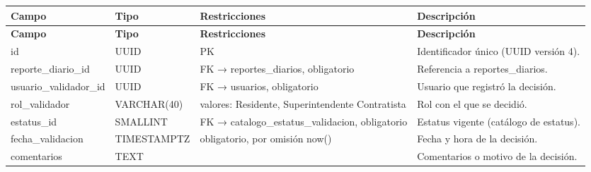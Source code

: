 \begin{xltabular}{\linewidth}{@{}>{\ttfamily\footnotesize}p{4.9cm}>{\ttfamily\footnotesize}p{2.4cm}>{\raggedright\arraybackslash\footnotesize}p{3.3cm}>{\footnotesize}X@{}}
\toprule\normalfont\sffamily\bfseries\footnotesize Campo & \normalfont\sffamily\bfseries\footnotesize Tipo & \sffamily\bfseries Restricciones & \sffamily\bfseries Descripción\\\midrule\endfirsthead
\toprule\normalfont\sffamily\bfseries\footnotesize Campo & \normalfont\sffamily\bfseries\footnotesize Tipo & \sffamily\bfseries Restricciones & \sffamily\bfseries Descripción\\\midrule\endhead
\bottomrule\endfoot
id & UUID & PK & Identificador único (UUID versión 4).\\
reporte\_diario\_id & UUID & FK → reportes\_diarios, obligatorio & Referencia a reportes\_diarios.\\
usuario\_validador\_id & UUID & FK → usuarios, obligatorio & Usuario que registró la decisión.\\
rol\_validador & VARCHAR(40) & valores: Residente, Superintendente Contratista & Rol con el que se decidió.\\
estatus\_id & SMALLINT & FK → catalogo\_estatus\_validacion, obligatorio & Estatus vigente (catálogo de estatus).\\
fecha\_validacion & TIMESTAMPTZ & obligatorio, por omisión now() & Fecha y hora de la decisión.\\
comentarios & TEXT &  & Comentarios o motivo de la decisión.\\
\end{xltabular}

